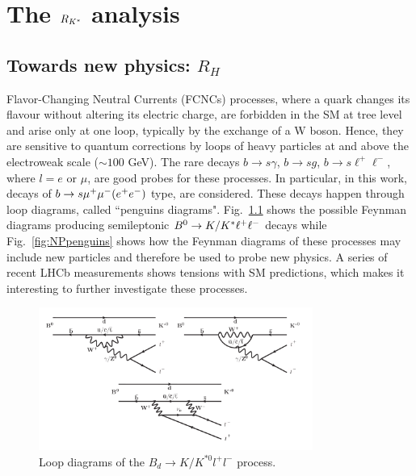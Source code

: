 \part{The $R_{{{K}^*}}$ analysis}

\chapter{Towards new physics: $R_H$}
\label{sec:RKst_theory}

Flavor-Changing Neutral Currents (FCNCs) processes, where a quark changes its flavour without altering its 
electric charge, are forbidden in the SM at tree level and arise only at one loop, typically by the exchange 
of a W boson. Hence, they are sensitive to quantum corrections by loops of heavy particles at and above the 
electroweak scale ($\sim 100$ GeV). The rare decays $b \rightarrow s \gamma $, $b \rightarrow s g$, 
$b \rightarrow s \ell^+\ell^-$, where $l =  e \text{ or } \mu$, are good probes for these processes. 
In particular, in this work, decays of $b \rightarrow s{\mu^+\mu^-} (e^+ e^-)$ type, are considered. These decays happen 
through loop diagrams, called ``penguins diagrams". Fig.~\ref{fig:RKpenguins} shows the possible Feynman diagrams 
producing semileptonic ${{B}^0} \rightarrow K/{{K}^*}\ell^+\ell^-$ decays while Fig.~\ref{fig:NPpenguins} shows how the Feynman 
diagrams of these processes may include new particles and therefore be used to probe new physics. 
A series of recent LHCb measurements \cite{TomRDreview} shows tensions with SM predictions, which makes it
interesting to further investigate these processes.


\begin{figure}[h]
\centering \includegraphics[width=0.8\textwidth]{RKst/figs/penguins3.png}
\caption{Loop diagrams of the $B_d \rightarrow K/K^{*0}l^+l^-$ process.}
\label{fig:RKpenguins}
\end{figure}

